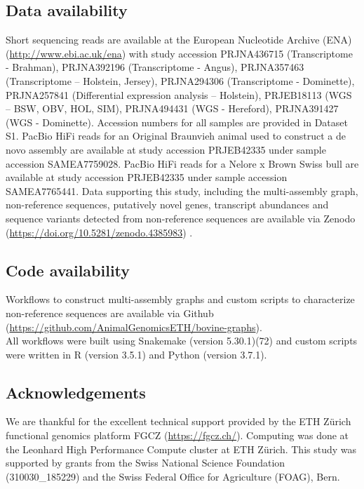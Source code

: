 \documentclass[../main.tex]{subfiles}
\begin{document}
\subsection*{Data availability}

Short sequencing reads are available at the European Nucleotide Archive (ENA) (\url{http://www.ebi.ac.uk/ena}) with study accession PRJNA436715 (Transcriptome - Brahman), PRJNA392196 (Transcriptome - Angus), PRJNA357463 (Transcriptome – Holstein, Jersey), PRJNA294306 (Transcriptome - Dominette), PRJNA257841 (Differential expression analysis – Holstein), PRJEB18113 (WGS – BSW, OBV, HOL, SIM), PRJNA494431 (WGS - Hereford), PRJNA391427 (WGS - Dominette). Accession numbers for all samples are provided in Dataset S1. PacBio HiFi reads for an Original Braunvieh animal used to construct a de novo assembly are available at study accession PRJEB42335 under sample accession SAMEA7759028. PacBio HiFi reads for a Nelore x Brown Swiss bull are available at study accession PRJEB42335 under sample accession SAMEA7765441. Data supporting this study, including the multi-assembly graph, non-reference sequences, putatively novel genes, transcript abundances and sequence variants detected from non-reference sequences are available via Zenodo (\url{https://doi.org/10.5281/zenodo.4385983}) \citep{Crysnanto2021}. 

\subsection*{Code availability}

Workflows to construct multi-assembly graphs and custom scripts to characterize non-reference sequences are available via Github \\
(\url{https://github.com/AnimalGenomicsETH/bovine-graphs}). \\
All workflows were built using Snakemake (version 5.30.1)(72) and custom scripts were written in R (version 3.5.1) \citep{RCoreTeam2017} and Python (version 3.7.1). 

\subsection*{Acknowledgements}

We are thankful for the excellent technical support provided by the ETH Zürich functional genomics platform FGCZ (\url{https://fgcz.ch/}). Computing was done at the Leonhard High Performance Compute cluster at ETH Zürich. This study was supported by grants from the Swiss National Science Foundation (310030\_185229) and the Swiss Federal Office for Agriculture (FOAG), Bern.



\singlespacing
\footnotesize




\ifdefined\BuildingFromMainFile
\else
   
\end{document}
